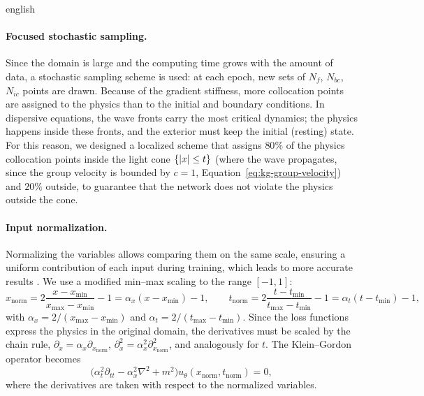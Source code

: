 \documentclass[../0000.tex]{subfiles}
\begin{document}
\begin{hyphenrules}{english}
\paragraph{Focused stochastic sampling.}\label{subsec:sampling}
Since the domain is large and the computing time grows with the amount of data, a stochastic sampling
scheme is used: at each epoch, new sets of $N_f$, $N_{bc}$, $N_{ic}$ points are drawn. Because of the
gradient stiffness, more collocation points are assigned to the physics than to the initial and boundary
conditions. In dispersive equations, the wave fronts carry the most critical dynamics; the physics happens
inside these fronts, and the exterior must keep the initial (resting) state. For this reason, we designed
a localized scheme that assigns $80\%$ of the physics collocation points inside the light cone
$\{\left\lvert x \right\rvert\le t\}$ (where the wave propagates, since the group velocity is bounded by $c=1$,
Equation~\eqref{eq:kg-group-velocity}) and $20\%$ outside, to guarantee that the network does not violate the physics
outside the cone.

\paragraph{Input normalization.}
Normalizing the variables allows comparing them on the same scale, ensuring a uniform contribution of each
input during training, which leads to more accurate results \cite{xu2025preprocessing}. We use a
modified min--max scaling to the range $[-1,1]$:
\begin{equation}
  x_{\mathrm{norm}}=2\frac{x-x_{\min}}{x_{\max}-x_{\min}}-1=\alpha_x(x-x_{\min})-1,\qquad
  t_{\mathrm{norm}}=2\frac{t-t_{\min}}{t_{\max}-t_{\min}}-1=\alpha_t(t-t_{\min})-1,
  \label{eq:normalization}
\end{equation}
with $\alpha_x=2/(x_{\max}-x_{\min})$ and $\alpha_t=2/(t_{\max}-t_{\min})$. Since the loss functions
express the physics in the original domain, the derivatives must be scaled by the chain rule,
$\partial_x=\alpha_x\partial_{x_{\mathrm{norm}}}$, $\partial_x^2=\alpha_x^2\partial^2_{x_{\mathrm{norm}}}$,
and analogously for $t$. The Klein--Gordon operator becomes
\begin{equation}
  \big(\alpha_t^2\partial_{tt}-\alpha_x^2\nabla^2+m^2\big)u_\theta(x_{\mathrm{norm}},t_{\mathrm{norm}})=0,
  \label{eq:kg-normalized}
\end{equation}
where the derivatives are taken with respect to the normalized variables.


\end{hyphenrules}
\end{document}
